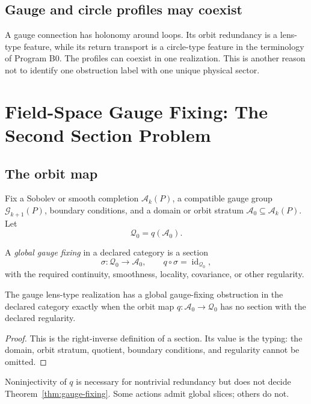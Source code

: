 \documentclass[11pt]{article}
\newcommand{\id}{\operatorname{id}}
\newcommand{\Conn}{\mathcal A}
\newcommand{\Gg}{\mathcal G}
\newcommand{\Orb}{\mathcal Q}
\begin{document}
\subsection{Gauge and circle profiles may coexist}

A gauge connection has holonomy around loops.  Its orbit redundancy is a
lens-type feature, while its return transport is a circle-type feature in the
terminology of Program B0.  The profiles can coexist in one realization.  This
is another reason not to identify one obstruction label with one unique
physical sector.

\section{Field-Space Gauge Fixing: The Second Section Problem}

\subsection{The orbit map}

Fix a Sobolev or smooth completion $\Conn_k(P)$, a compatible gauge group
$\Gg_{k+1}(P)$, boundary conditions, and a domain or orbit stratum
$\Conn_0\subseteq\Conn_k(P)$.  Let
\[
 \Orb_0=q(\Conn_0).
\]

\begin{definition}
\label{def:gauge-fixing}
A \emph{global gauge fixing} in a declared category is a section
\[
 \sigma:\Orb_0\longrightarrow\Conn_0,
\qquad
 q\circ\sigma=\id_{\Orb_0},
\]
with the required continuity, smoothness, locality, covariance, or other
regularity.
\end{definition}

\begin{theorem}
\label{thm:gauge-fixing}
The gauge lens-type realization has a global gauge-fixing obstruction in the
declared category exactly when the orbit map $q:\Conn_0\to\Orb_0$ has no
section with the declared regularity.
\end{theorem}

\begin{proof}
This is the right-inverse definition of a section.  Its value is the typing:
the domain, orbit stratum, quotient, boundary conditions, and regularity cannot
be omitted.
\end{proof}

Noninjectivity of $q$ is necessary for nontrivial redundancy but does not decide
Theorem~\ref{thm:gauge-fixing}.  Some actions admit global slices; others do
not.
\end{document}

